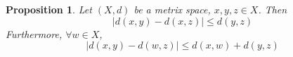 \documentclass{article}
\newtheorem{proposition}[theorem]{Proposition}
\begin{document}
\begin{proposition}
    Let $(X, d)$ be a metrix space, $x, y, z \in X$. Then 
    \begin{equation}
        |d(x,y) - d(x,z)| \leq d(y,z)
    \end{equation}
    Furthermore, $\forall w \in X$,
    \begin{equation}
        |d(x,y) - d(w,z)| \leq d(x,w) + d(y,z)
    \end{equation}
\end{proposition}
\end{document}

